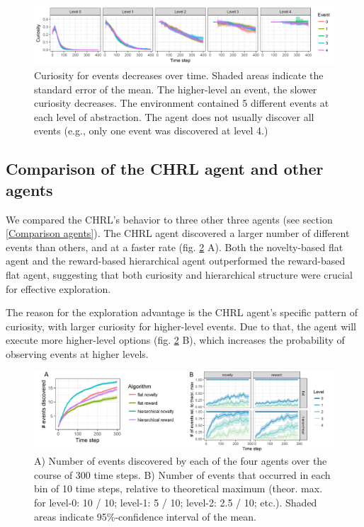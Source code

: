 \documentclass{article}
\begin{document}
\begin{figure}[h]
	\centering
	\includegraphics[width=\linewidth]{ACuriosity.png}
	\caption{Curiosity for events decreases over time. Shaded areas indicate the standard error of the mean. The higher-level an event, the slower curiosity decreases. The environment contained 5 different events at each level of abstraction. The agent does not usually discover all events (e.g., only one event was discovered at level 4.)}
	\label{CuriosityFigure}
\end{figure}

\subsection{Comparison of the CHRL agent and other agents} \label{Results compare all}

We compared the CHRL's behavior to three other three agents (see section \ref{Comparison agents}). The CHRL agent discovered a larger number of different events than others, and at a faster rate (fig. \ref{CEvents} A). Both the novelty-based flat agent and the reward-based hierarchical agent outperformed the reward-based flat agent, suggesting that both curiosity and hierarchical structure were crucial for effective exploration.

The reason for the exploration advantage is the CHRL agent's specific pattern of curiosity, with larger curiosity for higher-level events. Due to that, the agent will execute more higher-level options (fig. \ref{CEvents} B), which increases the probability of observing events at higher levels. 

\begin{figure}[h]
	\centering
	\includegraphics[width=\linewidth]{CEvents.jpg}
	\caption{A) Number of events discovered by each of the four agents over the course of 300 time steps. B) Number of events that occurred in each bin of 10 time steps, relative to theoretical maximum (theor. max. for level-0: 10 / 10; level-1: 5 / 10; level-2: 2.5 / 10; etc.). Shaded areas indicate 95\%-confidence interval of the mean.}
	\label{CEvents}
\end{figure}
\end{document}
